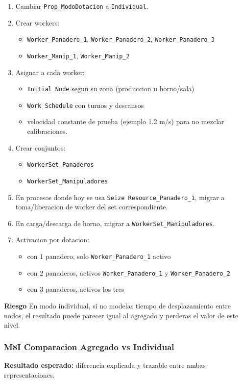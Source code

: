 \documentclass[11pt]{article}
\newcommand{\simio}[1]{\texttt{#1}}
\newcommand{\state}[1]{\texttt{#1}}
\newcommand{\risk}{\textcolor{rojoriesgo}{\textbf{Riesgo}}}
\begin{document}
\begin{enumerate}
  \item Cambiar \state{Prop\_ModoDotacion} a \simio{Individual}.
  \item Crear workers:
  \begin{itemize}
    \item \simio{Worker\_Panadero\_1}, \simio{Worker\_Panadero\_2}, \simio{Worker\_Panadero\_3}
    \item \simio{Worker\_Manip\_1}, \simio{Worker\_Manip\_2}
  \end{itemize}
  \item Asignar a cada worker:
  \begin{itemize}
    \item \simio{Initial Node} segun su zona (produccion u horno/sala)
    \item \simio{Work Schedule} con turnos y descansos
    \item velocidad constante de prueba (ejemplo 1.2 m/s) para no mezclar calibraciones.
  \end{itemize}
  \item Crear conjuntos:
  \begin{itemize}
    \item \simio{WorkerSet\_Panaderos}
    \item \simio{WorkerSet\_Manipuladores}
  \end{itemize}
  \item En procesos donde hoy se usa \simio{Seize Resource\_Panadero\_1}, migrar a toma/liberacion de worker del set correspondiente.
  \item En carga/descarga de horno, migrar a \simio{WorkerSet\_Manipuladores}.
  \item Activacion por dotacion:
  \begin{itemize}
    \item con 1 panadero, solo \simio{Worker\_Panadero\_1} activo
    \item con 2 panaderos, activos \simio{Worker\_Panadero\_1} y \simio{Worker\_Panadero\_2}
    \item con 3 panaderos, activos los tres
  \end{itemize}
\end{enumerate}

\risk{} En modo individual, si no modelas tiempo de desplazamiento entre nodos, el resultado puede parecer igual al agregado y perderas el valor de este nivel.

\subsubsection{M8I Comparacion Agregado vs Individual}
\textbf{Resultado esperado:} diferencia explicada y trazable entre ambas representaciones.
\end{document}
